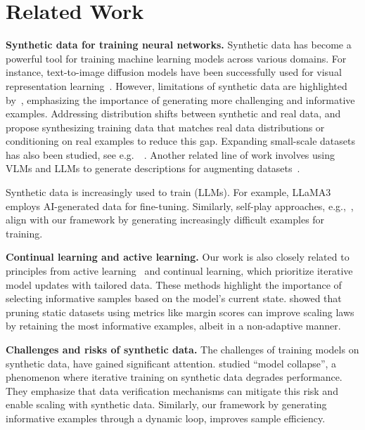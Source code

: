 \section{Related Work}
\textbf{Synthetic data for training neural networks.} Synthetic data has become a powerful tool for training machine learning models across various domains. For instance, text-to-image diffusion models have been successfully used for visual representation learning~\citep{astolfi2023instance, li2025genview, tian2024learning, tian2024stablerep, sariyildiz2023fake}. However,  limitations of synthetic data are highlighted by~\citet{fan2024scaling}, emphasizing the importance of generating more challenging and informative examples. Addressing distribution shifts between synthetic and real data, \citet{hemmat2023feedback} and \citet{yuan2023real} propose synthesizing training data that matches real data distributions or conditioning on real examples to reduce this gap. Expanding small-scale datasets has also been studied, see e.g.\ ~\citet{zhang2024expanding}.
Another related line of work involves using VLMs and LLMs to generate descriptions for augmenting datasets~\citep{dunlap2023diversify}.

Synthetic data is increasingly used to train (LLMs). For example, LLaMA3~\citep{grattafiori2024llama3herdmodels} employs AI-generated data for fine-tuning. Similarly, self-play approaches, e.g.,\ \citet{yuan2024self}, align with our framework by generating increasingly difficult examples for training.

\textbf{Continual learning and active learning.}
 Our work is also closely related to principles from active learning~\citep{bang2024active,evans2023bad} and continual learning, which prioritize iterative model updates with tailored data. These methods highlight the importance of selecting informative samples based on the model's current state.
 \cite{sorscher2022beyond} showed that pruning static datasets using metrics like margin scores can improve scaling laws by retaining the most informative examples, albeit in a non-adaptive manner.
 
\textbf{Challenges and risks of synthetic data.}
The challenges of training models on synthetic data, have gained significant attention. \citet{dohmatob2024strong,dohmatob2024tale} studied “model collapse”, a phenomenon where iterative training on synthetic data degrades performance. 
They emphasize that data verification mechanisms can mitigate this risk and enable scaling with synthetic data. Similarly, our framework by generating informative examples through a dynamic loop, improves sample efficiency.